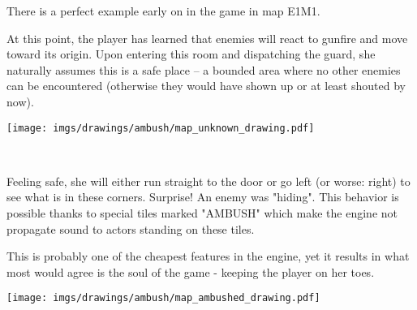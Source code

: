\par
\begin{minipage}{1\textwidth}
\begin{figure}[H]
 \centering
\end{figure}
\par


  \begin{minipage}{0.6\textwidth}
  There is a perfect example early on in the game in map E1M1.\\
  \par At this point, the player has learned that enemies will react to gunfire and move toward its origin. Upon entering this room and dispatching the guard, she naturally assumes this is a safe place -- a bounded area where no other enemies can be encountered (otherwise they would have shown up or at least shouted by now).
  \end{minipage}
  \begin{minipage}{0.4\textwidth}
  \begin{flushright}
  \texttt{[image: imgs/drawings/ambush/map\_unknown\_drawing.pdf]}
  \end{flushright}  
  \end{minipage}
\end{minipage}
\noindent
\\


\par
\begin{minipage}{1\textwidth}
  \begin{figure}[H]
   \centering
  \end{figure}
  \par
  \begin{minipage}{0.6\textwidth}
  Feeling safe, she will either run straight to the door or go left (or worse: right) to see what is in these corners. Surprise! An enemy was "hiding". This behavior is possible thanks to special tiles marked "AMBUSH" which make the engine not propagate sound to actors standing on these tiles.\\
  \par
   This is probably one of the cheapest features in the engine, yet it results in what most would agree is the soul of the game - keeping the player on her toes.
  \end{minipage}
  \begin{minipage}{0.4\textwidth}
  \begin{flushright}
  \texttt{[image: imgs/drawings/ambush/map\_ambushed\_drawing.pdf]}
  \end{flushright}
  \end{minipage}
\end{minipage}


